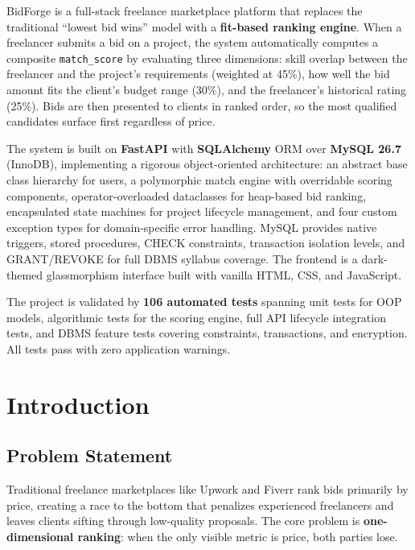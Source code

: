 \documentclass[12pt, a4paper]{report}
\begin{document}
BidForge is a full-stack freelance marketplace platform that replaces the traditional ``lowest bid wins'' model with a \textbf{fit-based ranking engine}. When a freelancer submits a bid on a project, the system automatically computes a composite \texttt{match\_score} by evaluating three dimensions: skill overlap between the freelancer and the project's requirements (weighted at 45\%), how well the bid amount fits the client's budget range (30\%), and the freelancer's historical rating (25\%). Bids are then presented to clients in ranked order, so the most qualified candidates surface first regardless of price.

The system is built on \textbf{FastAPI} with \textbf{SQLAlchemy} ORM over \textbf{MySQL 26.7} (InnoDB), implementing a rigorous object-oriented architecture: an abstract base class hierarchy for users, a polymorphic match engine with overridable scoring components, operator-overloaded dataclasses for heap-based bid ranking, encapsulated state machines for project lifecycle management, and four custom exception types for domain-specific error handling. MySQL provides native triggers, stored procedures, CHECK constraints, transaction isolation levels, and GRANT/REVOKE for full DBMS syllabus coverage. The frontend is a dark-themed glassmorphism interface built with vanilla HTML, CSS, and JavaScript.

The project is validated by \textbf{106 automated tests} spanning unit tests for OOP models, algorithmic tests for the scoring engine, full API lifecycle integration tests, and DBMS feature tests covering constraints, transactions, and encryption. All tests pass with zero application warnings.

\chapter{Introduction}

\section{Problem Statement}

Traditional freelance marketplaces like Upwork and Fiverr rank bids primarily by price, creating a race to the bottom that penalizes experienced freelancers and leaves clients sifting through low-quality proposals. The core problem is \textbf{one-dimensional ranking}: when the only visible metric is price, both parties lose.
\end{document}
